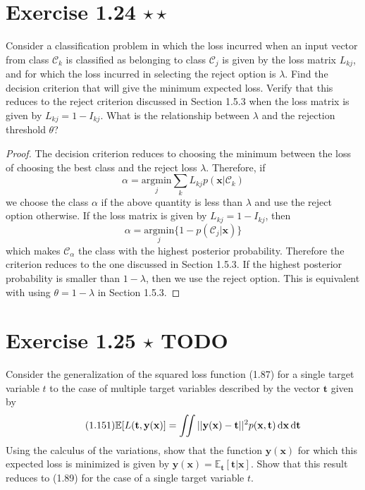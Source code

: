 \section*{Exercise 1.24 $\star \star$}
Consider a classification problem in which the loss incurred
when an input vector from class $\mathcal{C}_k$ is classified
as belonging to class $\mathcal{C}_j$ is given by the
loss matrix $L_{kj}$, and for which the loss incurred in
selecting the reject option is $\lambda$. Find the decision
criterion that will give the minimum expected loss. Verify
that this reduces to the reject criterion discussed in Section
1.5.3 when the loss matrix is given by $L_{kj} = 1 - I_{kj}$.
What is the relationship between $\lambda$ and the rejection
threshold $\theta$?

\vspace{1em}

\begin{proof}
    The decision criterion reduces to choosing the minimum between the loss
    of choosing the best class and the reject loss $\lambda$. Therefore, if
    \[
        \alpha = \underset{j}{\mathrm{argmin}} \sum_k L_{kj}p(\mathbf{x} | \mathcal{C}_k)
    \] 
    we choose the class $\alpha$ if the above quantity is less than $\lambda$ 
    and use the reject option otherwise. If the loss matrix is given
    by $L_{kj} = 1 - I_{kj}$, then 
    \[
        \alpha = \underset{j}{\mathrm{argmin}} \{1 - p(\mathcal{C}_j | \mathbf{x})\}
    \] 
    which makes $\mathcal{C}_{\alpha}$ the class with the highest posterior probability.
    Therefore the criterion reduces to the one discussed in Section 1.5.3.
    If the highest posterior probability is smaller than $1 - \lambda$, then
    we use the reject option. This is equivalent with using $\theta = 1 - \lambda$
    in Section 1.5.3.
\end{proof}

\section*{Exercise 1.25 $\star$ TODO}
Consider the generalization of the squared loss function (1.87) for
a single target variable $t$ to the case of multiple target variables
described by the vector $\mathbf{t}$ given by
\begin{equation}\label{eq:1.151}\tag{1.151}
    \mathbb{E}[L(\mathbf{t}, \mathbf{y}(\mathbf{x})] 
    = \iint ||\mathbf{y}(\mathbf{x}) - \mathbf{t}||^2 p(\mathbf{x}, \mathbf{t}) 
    \mathop{}\!\mathrm{d} \mathbf{x} \mathop{}\!\mathrm{d} \mathbf{t}
\end{equation}
Using the calculus of the variations, show that the function $\mathbf{y}(\mathbf{x})$ for
which this expected loss is minimized is given by 
$\mathbf{y}(\mathbf{x}) = \mathbb{E}_{\mathbf{t}}[\mathbf{t}|\mathbf{x}]$. 
Show that this result reduces to (1.89) for the case of a single target variable $t$. 

